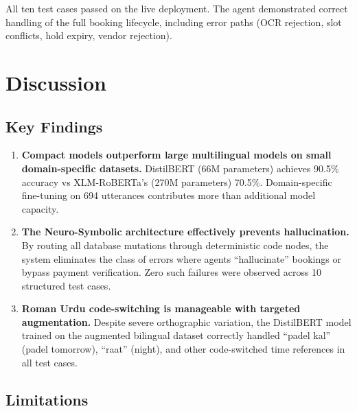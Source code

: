 \noindent All ten test cases passed on the live deployment.  The agent demonstrated
correct handling of the full booking lifecycle, including error paths (OCR rejection,
slot conflicts, hold expiry, vendor rejection).

\section{Discussion}
\label{sec:results-discussion}

\subsection{Key Findings}

\begin{enumerate}
  \item \textbf{Compact models outperform large multilingual models on small
        domain-specific datasets.}  DistilBERT (66M parameters) achieves 90.5\%
        accuracy vs XLM-RoBERTa's (270M parameters) 70.5\%.  Domain-specific
        fine-tuning on 694 utterances contributes more than additional model capacity.

  \item \textbf{The Neuro-Symbolic architecture effectively prevents hallucination.}
        By routing all database mutations through deterministic code nodes, the system
        eliminates the class of errors where agents ``hallucinate'' bookings or bypass
        payment verification.  Zero such failures were observed across 10 structured
        test cases.

  \item \textbf{Roman Urdu code-switching is manageable with targeted augmentation.}
        Despite severe orthographic variation, the DistilBERT model trained on the
        augmented bilingual dataset correctly handled ``padel kal'' (padel tomorrow),
        ``raat'' (night), and other code-switched time references in all test cases.
\end{enumerate}

\subsection{Limitations}

